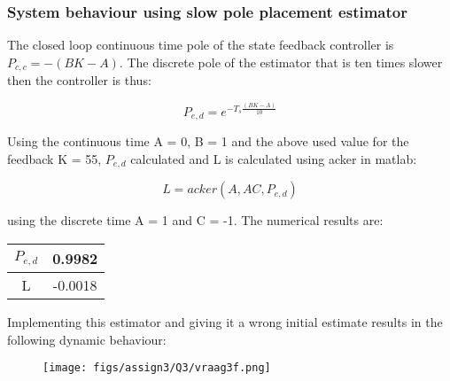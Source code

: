 \documentclass[a4paper]{article}
\newcommand{\newpar}{\vspace{.3cm}\noindent}
\begin{document}
\subsubsection{System behaviour using slow pole placement estimator}

The closed loop continuous time pole of the state feedback controller is $P_{c,c} = -(BK-A)$. The discrete pole of the estimator that is ten times slower then the controller is thus:

\begin{equation}
    P_{e,d} = e^{-T_{s}\frac{\left(BK-A\right)}{10}}
\end{equation}

\newpar
Using the continuous time A = 0, B = 1 and the above used value for the feedback K = 55, $P_{e,d}$ calculated and L is calculated using acker in matlab:

\begin{equation}
    L = acker(A,AC,P_{e,d})
\end{equation}

\nawpar
using the discrete time A = 1 and C = -1. The numerical results are:

\begin{center}
    \begin{tabular}{|c|c|}
        \hline
        $P_{e,d}$ & 0.9982 \\
        \hline
        L & -0.0018 \\
        \hline
    \end{tabular}
\end{center}

\newpar
Implementing this estimator and giving it a wrong initial estimate results in the following dynamic behaviour:

\begin{figure}[H]
    \centering
    \texttt{[image: figs/assign3/Q3/vraag3f.png]}
    \label{fig:poleplacementcontrollerstate}
\end{figure}
\end{document}
